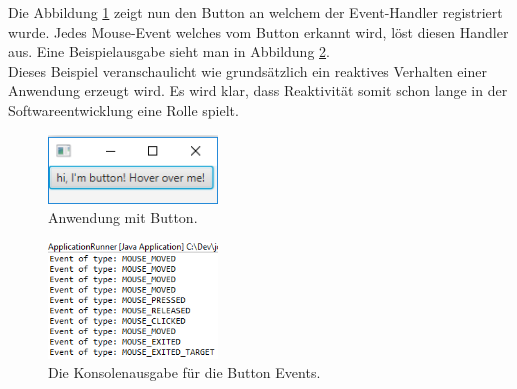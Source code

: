 
Die Abbildung \ref{pic:buttonapp} zeigt nun den Button an welchem der Event-Handler registriert wurde. Jedes Mouse-Event welches vom Button erkannt wird, löst diesen Handler aus. Eine Beispielausgabe sieht man in Abbildung \ref{pic:consoleoutput}. \\ Dieses Beispiel veranschaulicht wie grundsätzlich ein reaktives Verhalten einer Anwendung erzeugt wird. Es wird klar, dass Reaktivität somit schon lange in der Softwareentwicklung eine Rolle spielt.
\begin{figure}[hbt]
	\centering
	\includegraphics[width=0.4\textwidth]{Abb/buttonapp.PNG}
	\caption{Anwendung mit Button.}
	\label{pic:buttonapp}
\end{figure}
\begin{figure}[htb]
	\centering
	\includegraphics[width=0.4\textwidth]{Abb/consoleoutput.PNG}
	\caption{Die Konsolenausgabe für die Button Events.}
	\label{pic:consoleoutput}
\end{figure}
